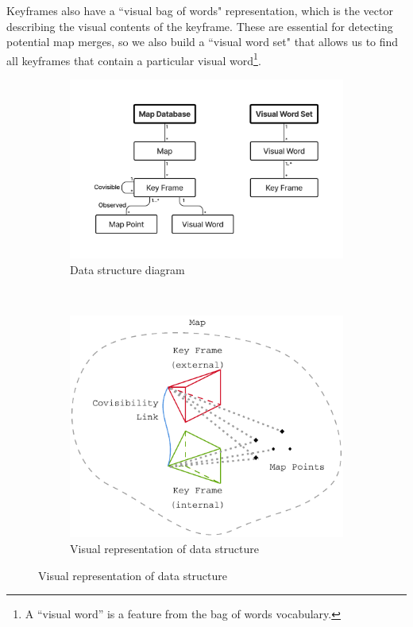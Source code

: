 Keyframes also have a ``visual bag of words" representation, which is the vector describing the visual contents of the keyframe. These are essential for detecting potential map merges, so we also build a ``visual word set" that allows us to find all keyframes that contain a particular visual word\footnote[1]{A ``visual word'' is a feature from the bag of words vocabulary.}.


\begin{figure}[h]
    \centering
    \begin{subfigure}[b]{0.475\textwidth}
        \centering
        \includegraphics[trim=5cm 4cm 5cm 5cm, width=\textwidth]{figures/datastructure_diagram.pdf}
        \caption{Data structure diagram}
        \label{fig:datastructure-diagram}
    \end{subfigure}\hfill%
    ~
    \begin{subfigure}[b]{0.425\textwidth}
        \centering
        \includegraphics[width=\textwidth]{figures/datastructure_viz.pdf}
        \caption{Visual representation of data structure}
        \label{fig:datastructure-viz}
    \end{subfigure}%
\end{figure}

